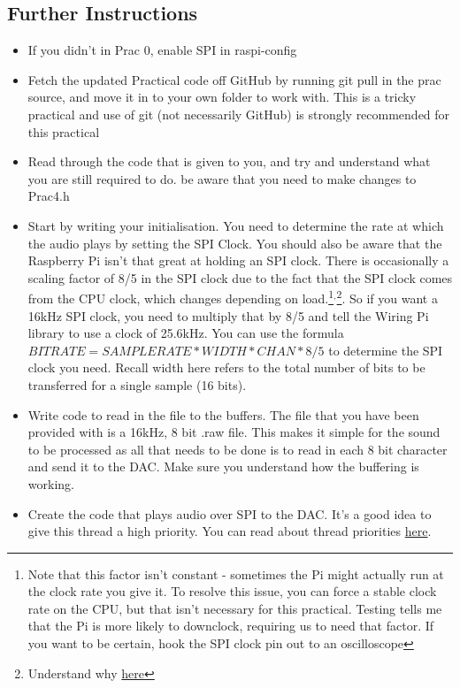 \subsection{Further Instructions}
\begin{itemize}
    \item If you didn't in Prac 0, enable SPI in raspi-config
    \item Fetch the updated Practical code off GitHub by running git pull in the prac source, and move it in to your own folder to work with. This is a tricky practical and use of git (not necessarily GitHub) is strongly recommended for this practical
    \item Read through the code that is given to you, and try and understand what you are still required to do. be aware that you need to make changes to Prac4.h
    \item Start by writing your initialisation. You need to determine the rate at which the audio plays by setting the SPI Clock. You should also be aware that the Raspberry Pi isn't that great at holding an SPI clock. There is occasionally a scaling factor of 8/5 in the SPI clock due to the fact that the SPI clock comes from the CPU clock, which changes depending on load.\footnote{Note that this factor isn't constant - sometimes the Pi might actually run at the clock rate you give it. To resolve this issue, you can force a stable clock rate on the CPU, but that isn't necessary for this practical. Testing tells me that the Pi is more likely to downclock, requiring us to need that factor. If you want to be certain, hook the SPI clock pin out to an oscilloscope}$^,$\footnote{Understand why \href{https://github.com/raspberrypi/linux/issues/2094}{here}}. So if you want a 16kHz SPI clock, you need to multiply that by 8/5 and tell the Wiring Pi library to use a clock of 25.6kHz. You can use the formula $BITRATE = SAMPLE RATE * WIDTH * CHAN * 8/5$ to determine the SPI clock you need. Recall width here refers to the total number of bits to be transferred for a single sample (16 bits).
    \item Write code to read in the file to the buffers. The file that you have been provided with is a 16kHz, 8 bit .raw file. This makes it simple for the sound to be processed as all that needs to be done is to read in each 8 bit character and send it to the DAC. Make sure you understand how the buffering is working.
    \item Create the code that plays audio over SPI to the DAC. It's a good idea to give this thread a high priority. You can read about thread priorities \href{https://docs.oracle.com/cd/E19455-01/806-5257/attrib-16/index.html}{here}.

\end{itemize}
